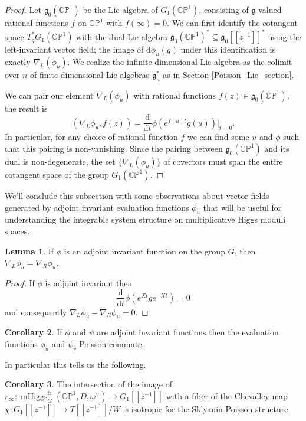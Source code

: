 \documentclass[11pt, oneside, reqno]{amsart}
\theoremstyle{definition} \newtheorem{definition}{Definition}[section]
\newtheorem{lemma}[definition]{Lemma}
\newtheorem{corollary}[definition]{Corollary}
\theoremstyle{definition} \newtheorem{remark}[definition]{Remark}
\theoremstyle{definition} \newtheorem{remarks}[definition]{Remarks}
\theoremstyle{definition} \newtheorem{question}[definition]{Question}
\theoremstyle{definition} \newtheorem*{note}{Note}
\theoremstyle{definition} \newtheorem{example}[definition]{Example}
\theoremstyle{definition} \newtheorem{examples}[definition]{Examples}
\renewcommand{\gg}{\mathfrak{g}}
\newcommand{\bb}[1]{\mathbb{#1}}
\newcommand{\sub}{\subseteq}
\DeclareMathOperator{\mhiggs}{mHiggs}
\renewcommand{\d}{\mathrm{d}}
\newcommand{\fr}{\mathrm{fr}}
\begin{document}
\begin{proof}
Let $\gg_0(\bb{CP}^1)$ be the Lie algebra of $G_1(\bb{CP}^1)$, consisting of $\gg$-valued rational functions $f$ on $\bb{CP}^1$ with $f(\infty) = 0$. We can first identify the cotangent space $T^*_g G_1(\bb{CP}^1)$ with the dual Lie algebra $\gg_0(\bb{CP}^1)^* \sub \gg_0[[z^{-1}]]^*$ using the left-invariant vector field; the image of $\d \phi_u(g)$ under this identification is exactly $\nabla_L(\phi_u)$.  We realize the infinite-dimensional Lie algebra as the colimit over $n$ of finite-dimensional Lie algebras $\gg_n^*$ as in Section \ref{Poisson_Lie_section}. 

We can pair our element $\nabla_L(\phi_u)$ with rational functions $f(z) \in \gg_0(\bb{CP}^1)$, the result is
\[(\nabla_{L} \phi_u, f(z)) = \frac{\d}{\d t} \phi(e^{f(u) t} g(u))|_{t=0}.\]
In particular, for any choice of rational function $f$ we can find some $u$ and $\phi$ such that this pairing is non-vanishing.  Since the pairing between $\gg_0(\bb{CP}^1)$ and its dual is non-degenerate, the set $\{\nabla_L(\phi_u)\}$ of covectors must span the entire cotangent space of the group $G_1(\bb{CP}^1)$.
\end{proof}

We'll conclude this subsection with some observations about vector fields generated by adjoint invariant evaluation functions $\phi_u$ that will be useful for understanding the integrable system structure on multiplicative Higgs moduli spaces. 
\begin{lemma}
 If $\phi$ is an adjoint invariant function on the group $G$, then
$\nabla_{L} \phi_u  = \nabla_{R} \phi_u$. 
\end{lemma}

\begin{proof}
  If $\phi$ is adjoint invariant then
  \[
    \frac{\d}{\d t} \phi(e^{Xt} g e^{-Xt}) = 0
  \]
  and consequently $\nabla_{L} \phi_u - \nabla_{R} \phi_u  = 0$. 
\end{proof}

\begin{corollary}\label{cor:poisson-commuting}
  If $\phi$ and $\psi$ are adjoint invariant functions then the evaluation functions $\phi_u$ and $\psi_v$ Poisson commute.
\end{corollary}

In particular this tells us the following.

\begin{corollary}\label{isotropic_fiber_cor}
The intersection of the image of $r_\infty \colon \mhiggs^\fr_G(\bb{CP}^1, D, \omega^\vee) \to G_1[[z^{-1}]]$ with a fiber of the Chevalley map $\chi \colon G_1[[z^{-1}]] \to T[[z^{-1}]]/W$ is isotropic for the Sklyanin Poisson structure.
\end{corollary}
\end{document}
